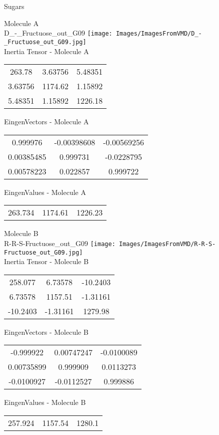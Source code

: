 \vtab[-2cm]
\begin{center}
{\large Sugars}
\end{center}
\begin{multicols}{2}
\begin{center}
Molecule A \\ 
D\_-\_Fructuose\_out\_G09
\texttt{[image: Images/ImagesFromVMD/D\_-\_Fructuose\_out\_G09.jpg]}
\\
Inertia Tensor - Molecule A \\
\vtab
\begin{tabular}{|c c c|}
263.78	 & 	3.63756	 & 	5.48351	 \\
3.63756	 & 	1174.62	 & 	1.15892	 \\
5.48351	 & 	1.15892	 & 	1226.18
\end{tabular}

\vtab
 EingenVectors - Molecule A     \\
\vtab
\begin{tabular}{|c c c|}
0.999976	 & 	-0.00398608	 & 	-0.00569256	 \\
0.00385485	 & 	0.999731	 & 	-0.0228795	 \\
0.00578223	 & 	0.022857	 & 	0.999722
\end{tabular}

\vtab
 EingenValues - Molecule A     \\
\vtab
\begin{tabular}{|c c c|}
263.734	 & 	1174.61	 & 	1226.23
\end{tabular}
\columnbreak

Molecule B \\ 
R-R-S-Fructuose\_out\_G09
\texttt{[image: Images/ImagesFromVMD/R-R-S-Fructuose\_out\_G09.jpg]}
\\
Inertia Tensor - Molecule B \\
\vtab
\begin{tabular}{|c c c|}
258.077	 & 	6.73578	 & 	-10.2403	 \\
6.73578	 & 	1157.51	 & 	-1.31161	 \\
-10.2403	 & 	-1.31161	 & 	1279.98
\end{tabular}

\vtab
 EingenVectors - Molecule B     \\
\vtab
\begin{tabular}{|c c c|}
-0.999922	 & 	0.00747247	 & 	-0.0100089	 \\
0.00735899	 & 	0.999909	 & 	0.0113273	 \\
-0.0100927	 & 	-0.0112527	 & 	0.999886
\end{tabular}

\vtab
 EingenValues - Molecule B     \\
\vtab
\begin{tabular}{|c c c|}
257.924	 & 	1157.54	 & 	1280.1
\end{tabular}

\end{center}
\end{multicols}

